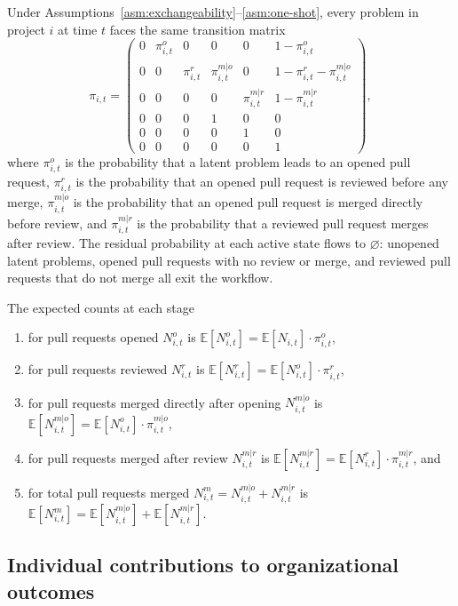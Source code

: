 \documentclass[source/paper/main.tex]{subfiles}
\begin{document}
Under Assumptions~\ref{asm:exchangeability}--\ref{asm:one-shot}, every problem in project $i$ at time $t$ faces the same transition matrix
$$
\pi_{i,t} =
\begin{pmatrix}
0 & \pi_{i,t}^o & 0 & 0 & 0 & 1-\pi_{i,t}^o \\
0 & 0 & \pi_{i,t}^r & \pi_{i,t}^{m|o} & 0 & 1-\pi_{i,t}^r-\pi_{i,t}^{m|o} \\
0 & 0 & 0 & 0 & \pi_{i,t}^{m|r} & 1-\pi_{i,t}^{m|r} \\
0 & 0 & 0 & 1 & 0 & 0 \\
0 & 0 & 0 & 0 & 1 & 0 \\
0 & 0 & 0 & 0 & 0 & 1
\end{pmatrix},
$$
where $\pi_{i,t}^o$ is the probability that a latent problem leads to an opened pull request, $\pi_{i,t}^r$ is the probability that an opened pull request is reviewed before any merge, $\pi_{i,t}^{m|o}$ is the probability that an opened pull request is merged directly before review, and $\pi_{i,t}^{m|r}$ is the probability that a reviewed pull request merges after review.
The residual probability at each active state flows to $\varnothing$: unopened latent problems, opened pull requests with no review or merge, and reviewed pull requests that do not merge all exit the workflow.

The expected counts at each stage
\begin{enumerate}
    \item for pull requests opened $N_{i,t}^o$ is $\mathbb{E}[N_{i,t}^o] = \mathbb{E}[N_{i,t}]\cdot\pi_{i,t}^o$,
    \item for pull requests reviewed $N_{i,t}^r$ is $\mathbb{E}[N_{i,t}^r] = \mathbb{E}[N_{i,t}^o]\cdot\pi_{i,t}^r$,
    \item for pull requests merged directly after opening $N_{i,t}^{m|o}$ is $\mathbb{E}[N_{i,t}^{m|o}] = \mathbb{E}[N_{i,t}^o]\cdot\pi_{i,t}^{m|o}$,
    \item for pull requests merged after review $N_{i,t}^{m|r}$ is $\mathbb{E}[N_{i,t}^{m|r}] = \mathbb{E}[N_{i,t}^r]\cdot\pi_{i,t}^{m|r}$, and
    \item for total pull requests merged $N_{i,t}^m = N_{i,t}^{m|o}+N_{i,t}^{m|r}$ is $\mathbb{E}[N_{i,t}^m] = \mathbb{E}[N_{i,t}^{m|o}] + \mathbb{E}[N_{i,t}^{m|r}]$.
\end{enumerate}

\subsection{Individual contributions to organizational outcomes}
\end{document}
